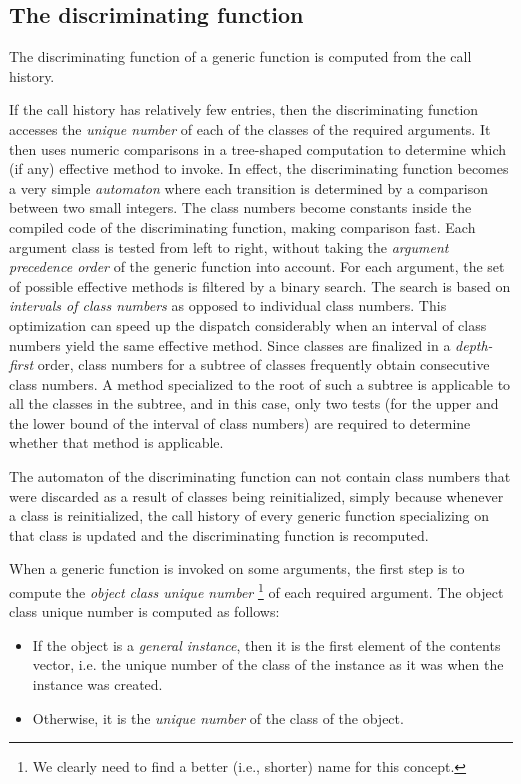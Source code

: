 \subsection{The discriminating function}
\label{sec-generic-function-dispatch-the-discriminating-function}

The discriminating function of a generic function is computed from the
call history.

If the call history has relatively few entries, then the
discriminating function accesses the \emph{unique number} of each of
the classes of the required arguments.  It then uses numeric
comparisons in a tree-shaped computation to determine which (if any)
effective method to invoke.  In effect, the discriminating function
becomes a very simple \emph{automaton} where each transition is
determined by a comparison between two small integers.  The class
numbers become constants inside the compiled code of the
discriminating function, making comparison fast.  Each argument class
is tested from left to right, without taking the \emph{argument
  precedence order} of the generic function into account.  For each
argument, the set of possible effective methods is filtered by a
binary search.  The search is based on \emph{intervals of class
  numbers} as opposed to individual class numbers.  This optimization
can speed up the dispatch considerably when an interval of class
numbers yield the same effective method.  Since classes are finalized
in a \emph{depth-first} order, class numbers for a subtree of classes
frequently obtain consecutive class numbers.  A method specialized to
the root of such a subtree is applicable to all the classes in the
subtree, and in this case, only two tests (for the upper and the lower
bound of the interval of class numbers) are required to determine
whether that method is applicable. 

The automaton of the discriminating function can not contain class
numbers that were discarded as a result of classes being
reinitialized, simply because whenever a class is reinitialized, the
call history of every generic function specializing on that class is
updated and the discriminating function is recomputed.  

When a generic function is invoked on some arguments, the first step
is to compute the \emph{object class unique number}%
\footnote{We clearly need to find a better (i.e., shorter) name for
  this concept.} of each required argument.  The object class unique
number is computed as follows:

\begin{itemize}
\item If the object is a \emph{general instance}, then it is the first
  element of the contents vector, i.e. the unique number of the class
  of the instance as it was when the instance was created.
\item Otherwise, it is the \emph{unique number} of the class of the
  object.
\end{itemize}


